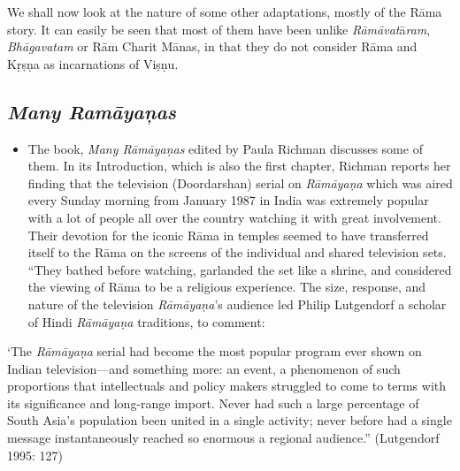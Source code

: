 We shall now look at the nature of some other adaptations, mostly of the Rāma story. It can easily be seen that most of them have been unlike \textit{Rāmāvat}ā\textit{ram}, \textit{Bhāgavatam} or Rām Charit Mānas, in that they do not consider Rāma and Kṛṣṇa as incarnations of Viṣṇu.


\subsection*{\textit{Many Ramāyaņas}}

\begin{itemize}
\item The book, \textit{Many Rāmāyaṇas} edited by Paula Richman discusses some of them. In its Introduction, which is also the first chapter, Richman reports her finding that the television (Doordarshan) serial on \textit{Rāmāyaṇa} which was aired every Sunday morning from January 1987 in India was extremely popular with a lot of people all over the country watching it with great involvement. Their devotion for the iconic Rāma in temples seemed to have transferred itself to the Rāma on the screens of the individual and shared television sets. “They bathed before watching, garlanded the set like a shrine, and considered the viewing of Rāma to be a religious experience. The size, response, and nature of the television \textit{Rāmāyaṇa}'s audience led Philip Lutgendorf a scholar of Hindi \textit{Rāmāyaṇa} traditions, to comment:

\end{itemize}

\begin{myquote}
‘The \textit{Rāmāyaṇa} serial had become the most popular program ever shown on Indian television—and something more: an event, a phenomenon of such proportions that intellectuals and policy makers struggled to come to terms with its significance and long-range import. Never had such a large percentage of South Asia's population been united in a single activity; never before had a single message instantaneously reached so enormous a regional audience.” (Lutgendorf 1995: 127)
\end{myquote}

